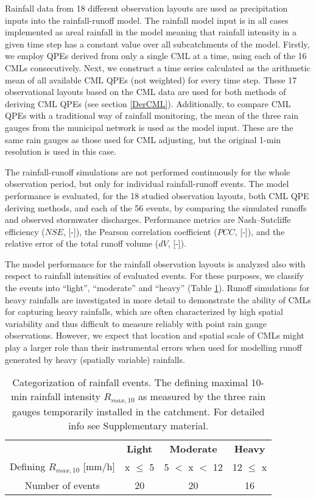 \documentclass{ctuthesis}\usepackage[]{graphicx}\usepackage[]{color}
\begin{document}
Rainfall data from 18 different observation layouts are used as precipitation inputs into the rainfall-runoff model. The rainfall model input is in all cases implemented as areal rainfall in the model meaning that rainfall intensity in a given time step has a constant value over all subcatchments of the model. Firstly, we employ QPEs derived from only a single CML at a time, using each of the 16 CMLs consecutively. Next, we construct a time series calculated as the arithmetic mean of all available CML QPEs (not weighted) for every time step. These 17 observational layouts based on the CML data are used for both methods of deriving CML QPEs (see section \ref{DerCML}). Additionally, to compare CML QPEs with a traditional way of rainfall monitoring, the mean of the three rain gauges from the municipal network is used as the model input. These are the same rain gauges as those used for CML adjusting, but the original 1-min resolution is used in this case. 

The rainfall-runoff simulations are not performed continuously for the whole observation period, but only for individual rainfall-runoff events. The model performance is evaluated, for the 18 studied observation layouts, both CML QPE deriving methods, and each of the 56 events, by comparing the simulated runoffs and observed stormwater discharges. Performance metrics are Nash–Sutcliffe efficiency ($NSE$, [-]), the Pearson correlation coefficient ($PCC$, [-]), and the relative error of the total runoff volume ($dV$, [-]).

The model performance for the rainfall observation layouts is analyzed also with respect to rainfall intensities of evaluated events. For these purposes, we classify the events into “light”, “moderate” and “heavy” (Table \ref{2tab2}). Runoff simulations for heavy rainfalls are investigated in more detail to demonstrate the ability of CMLs for capturing heavy rainfalls, which are often characterized by high spatial variability and thus difficult to measure reliably with point rain gauge observations. However, we expect that location and spatial scale of CMLs might play a larger role than their instrumental errors when used for modelling runoff generated by heavy (spatially variable) rainfalls.

\begin{table}[h]
\begin{ctucolortab}
\centering
\begin{tabular}{ c | c  c  c  }
	    &       \textbf{Light}   &  \bfseries Moderate  &  \bfseries  Heavy    \\ \Midrule
        Defining $R_{max,10}$ [mm/h]  &  x $\leq$ 5  & 5 $<$ x $<$ 12 &  12 $\leq$ x     \\
            Number of events  &  20  & 20 &  16
\end{tabular}
\caption{Categorization of rainfall events. The defining maximal 10-min rainfall intensity $R_{max,10}$ as measured by the three rain gauges temporarily installed in the catchment. For detailed info see Supplementary material.}
\label{2tab2}
\end{ctucolortab}
\end{table}
\end{document}

